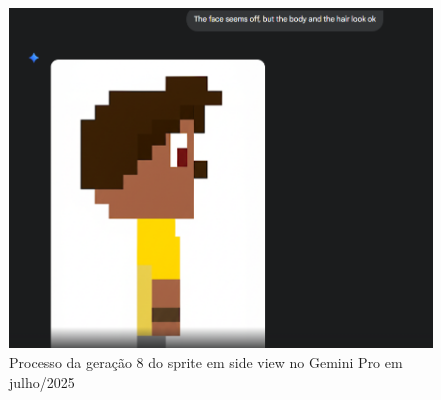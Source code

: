 \begin{figure}[htbp]
    \centering
    \caption{\small Processo da geração 8 do sprite em side view no Gemini Pro em julho/2025}
    \label{fig:geminiPro8}
        \includegraphics[width=0.5\linewidth]{figs/geminiPro/chat5/tela2.PNG}
\end{figure}



